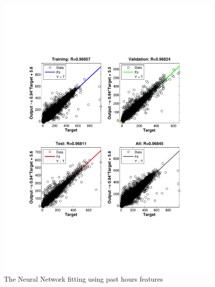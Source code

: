 \documentclass{sig-alternate}
\begin{document}
\begin{figure}[ht]
\centering
\includegraphics[scale = 0.4, trim = 250 150 250 150]{pic/reg1.pdf}
\caption{The Neural Network fitting using past hours features}
\end{figure}
\end{document}
